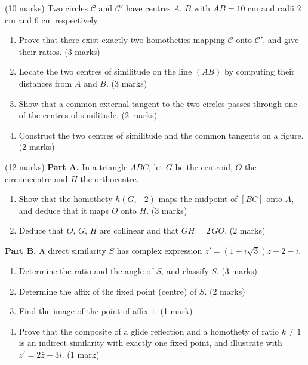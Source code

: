 \documentclass[11pt]{article}
\begin{document}
\begin{exercice} \hfill (10 marks)
Two circles $\mathcal{C}$ and $\mathcal{C}'$ have centres $A$, $B$ with $AB = 10$ cm and radii $2$ cm and $6$ cm respectively.
\begin{enumerate}
\item Prove that there exist exactly two homotheties mapping $\mathcal{C}$ onto $\mathcal{C}'$, and give their ratios. \hfill (3 marks)
\item Locate the two centres of similitude on the line $(AB)$ by computing their distances from $A$ and $B$. \hfill (3 marks)
\item Show that a common external tangent to the two circles passes through one of the centres of similitude. \hfill (2 marks)
\item Construct the two centres of similitude and the common tangents on a figure. \hfill (2 marks)
\end{enumerate}
\end{exercice}

\begin{exercice} \hfill (12 marks)
\textbf{Part A.} In a triangle $ABC$, let $G$ be the centroid, $O$ the circumcentre and $H$ the orthocentre.
\begin{enumerate}
\item Show that the homothety $h(G, -2)$ maps the midpoint of $[BC]$ onto $A$, and deduce that it maps $O$ onto $H$. \hfill (3 marks)
\item Deduce that $O$, $G$, $H$ are collinear and that $GH = 2\,GO$. \hfill (2 marks)
\end{enumerate}
\textbf{Part B.} A direct similarity $S$ has complex expression $z' = (1 + i\sqrt{3})z + 2 - i$.
\begin{enumerate}
\item Determine the ratio and the angle of $S$, and classify $S$. \hfill (3 marks)
\item Determine the affix of the fixed point (centre) of $S$. \hfill (2 marks)
\item Find the image of the point of affix $1$. \hfill (1 mark)
\item Prove that the composite of a glide reflection and a homothety of ratio $k \neq 1$ is an indirect similarity with exactly one fixed point, and illustrate with $z' = 2\bar{z} + 3i$. \hfill (1 mark)
\end{enumerate}
\end{exercice}
\end{document}

